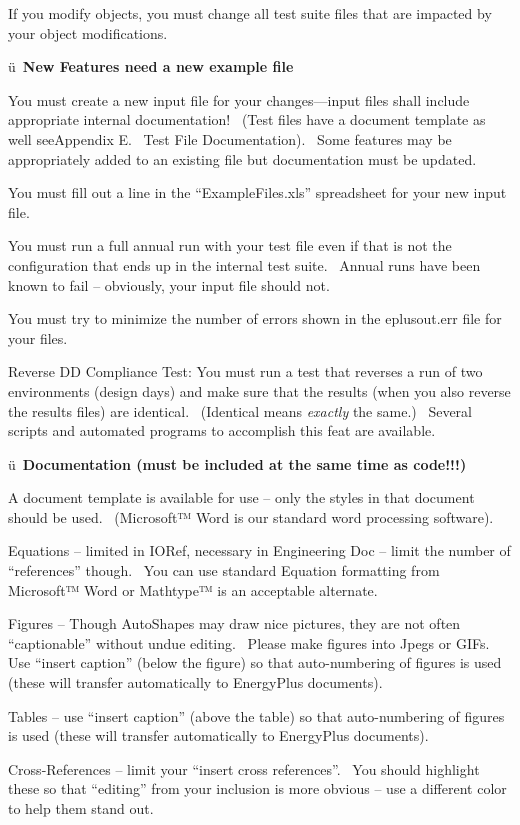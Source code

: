 If you modify objects, you must change all test suite files that are impacted by your object modifications.

ü~\textbf{New Features need a new example file}

You must create a new input file for your changes---input files shall include appropriate internal documentation!~ (Test files have a document template as well seeAppendix E.~ Test File Documentation).~ Some features may be appropriately added to an existing file but documentation must be updated.

You must fill out a line in the ``ExampleFiles.xls'' spreadsheet for your new input file.

You must run a full annual run with your test file even if that is not the configuration that ends up in the internal test suite.~ Annual runs have been known to fail -- obviously, your input file should not.

You must try to minimize the number of errors shown in the eplusout.err file for your files.

Reverse DD Compliance Test: You must run a test that reverses a run of two environments (design days) and make sure that the results (when you also reverse the results files) are identical.~ (Identical means \emph{exactly} the same.)~ Several scripts and automated programs to accomplish this feat are available.

ü~\textbf{Documentation (must be included at the same time as code!!!)}

A document template is available for use -- only the styles in that document should be used.~ (Microsoft™ Word is our standard word processing software).

Equations -- limited in IORef, necessary in Engineering Doc -- limit the number of ``references'' though.~ You can use standard Equation formatting from Microsoft™ Word or Mathtype™ is an acceptable alternate.

Figures -- Though AutoShapes may draw nice pictures, they are not often ``captionable'' without undue editing.~ Please make figures into Jpegs or GIFs.~ Use ``insert caption'' (below the figure) so that auto-numbering of figures is used (these will transfer automatically to EnergyPlus documents).

Tables -- use ``insert caption'' (above the table) so that auto-numbering of figures is used (these will transfer automatically to EnergyPlus documents).

Cross-References -- limit your ``insert cross references''.~ You should highlight these so that ``editing'' from your inclusion is more obvious -- use a different color to help them stand out.

